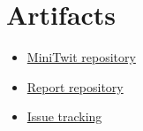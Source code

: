 \section{Artifacts}
\begin{itemize}
    \item \href{https://github.com/Dev-ops-Gaming/MiniTwit}{MiniTwit repository}
    \item \href{https://github.com/Dev-ops-Gaming/report}{Report repository}
    \item \href{https://github.com/Dev-ops-Gaming/MiniTwit/issues}{Issue tracking}
    
\end{itemize}